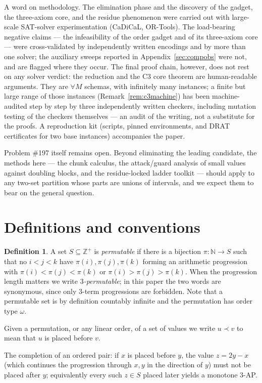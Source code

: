 \documentclass[11pt]{article}
\theoremstyle{definition}
\newtheorem{definition}[theorem]{Definition}
\newcommand{\Z}{\mathbb{Z}}
\newcommand{\N}{\mathbb{N}}
\begin{document}
A word on methodology. The elimination phase and the discovery of the
gadget, the three-axiom core, and the residue phenomenon were carried out
with large-scale SAT-solver experimentation (CaDiCaL, OR-Tools). The
load-bearing negative claims --- the infeasibility of the order gadget and
of its three-axiom core --- were cross-validated by independently written
encodings and by more than one solver; the auxiliary sweeps reported in
Appendix~\ref{sec:compobs} were not, and are flagged
where they occur. The
final proof chain, however, does not rest on any solver verdict: the
reduction and the C3 core theorem are human-readable arguments. They are
$\forall M$ schemas, with infinitely many instances; a finite but large
range of those instances (Remark~\ref{rem:c3machine}) has been
machine-audited step by step by three
independently written checkers, including mutation testing of the checkers
themselves --- an audit of the writing, not a substitute for the proofs.
A reproduction kit (scripts, pinned environments, and
DRAT certificates for two base instances) accompanies the paper.

Problem \#197 itself remains open. Beyond eliminating the leading candidate,
the methods here --- the chunk calculus, the attack/guard analysis of small
values against doubling blocks, and the residue-locked ladder toolkit ---
should apply to any two-set partition whose parts are unions of intervals,
and we expect them to bear on the general question.

\section{Definitions and conventions}

\begin{definition}
A set $S \subseteq \Z^+$ is \emph{permutable} if there is a bijection
$\pi\colon \N \to S$ such that no $i<j<k$ have $\pi(i),\pi(j),\pi(k)$ forming an
arithmetic progression with $\pi(i)<\pi(j)<\pi(k)$ or $\pi(i)>\pi(j)>\pi(k)$.
When the progression length matters we write \emph{$3$-permutable}; in this
paper the two words are synonymous, since only $3$-term progressions are
forbidden. Note that a permutable set is by definition countably infinite
and the permutation has order type $\omega$.
\end{definition}

Given a permutation, or any linear order, of a set of values we write
$u \prec v$ to mean that $u$ is placed before $v$.

The completion of an ordered pair: if $x$ is placed before $y$, the value
$z = 2y - x$ (which continues the progression through $x,y$ in the direction of
$y$) must not be placed after $y$; equivalently every such $z \in S$ placed later
yields a monotone 3-AP.
\end{document}
